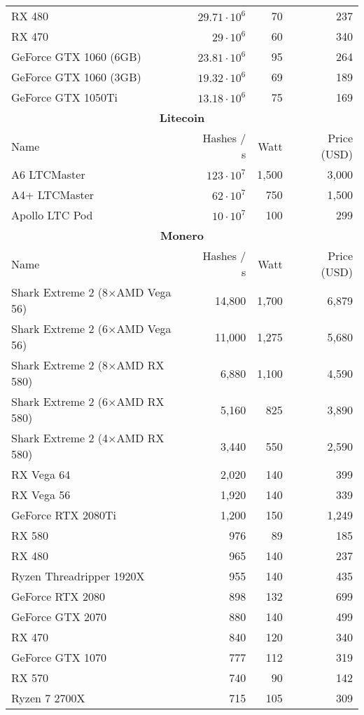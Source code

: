 \begin{longtable}{|p{}|r|r|r|}
  RX 480 & $29.71 \cdot 10^{6}$ & 70 & 237 \\
  RX 470 & $29 \cdot 10^{6}$ & 60 & 340 \\
  GeForce GTX 1060 (6GB) & $23.81 \cdot 10^{6}$ & 95 & 264 \\
  GeForce GTX 1060 (3GB) & $19.32 \cdot 10^{6}$ & 69 & 189 \\
  GeForce GTX 1050Ti & $13.18 \cdot 10^{6}$ & 75 & 169 \\
  \hline
  \multicolumn{4}{|c|}{\textbf{Litecoin}} \\
  \hline
  Name & Hashes / s & Watt & Price (USD) \\
  \hhline{|=|=|=|=|}
  A6 LTCMaster & $123 \cdot 10^{7}$ & 1,500 & 3,000 \\
  A4+ LTCMaster & $62 \cdot 10^{7}$ & 750 & 1,500 \\
  Apollo LTC Pod & $10 \cdot 10^{7}$ & 100 & 299 \\
  \hline
  \hline
  \multicolumn{4}{|c|}{\textbf{Monero}} \\
  \hline
  Name & Hashes / s & Watt & Price (USD) \\
  \hhline{|=|=|=|=|}
  Shark Extreme 2 \small(8$ \times $AMD Vega 56) & 14,800 & 1,700 & 6,879 \\
  Shark Extreme 2 \small(6$ \times $AMD Vega 56) & 11,000 & 1,275 & 5,680 \\
  Shark Extreme 2 \small(8$ \times $AMD RX 580) & 6,880 & 1,100 & 4,590 \\
  Shark Extreme 2 \small(6$ \times $AMD RX 580) & 5,160 & 825 & 3,890 \\
  Shark Extreme 2 \small(4$ \times $AMD RX 580) & 3,440 & 550 & 2,590 \\
  RX Vega 64 & 2,020 & 140 & 399 \\
  RX Vega 56 & 1,920 & 140 & 339 \\
  GeForce RTX 2080Ti & 1,200 & 150 & 1,249 \\
  RX 580 & 976 & 89 & 185 \\
  RX 480 & 965 & 140 & 237 \\
  Ryzen Threadripper 1920X & 955 & 140 & 435 \\
  GeForce RTX 2080 & 898 & 132 & 699 \\
  GeForce GTX 2070 & 880 & 140 & 499 \\
  RX 470 & 840 & 120 & 340 \\
  GeForce GTX 1070 & 777 & 112 & 319 \\
  RX 570 & 740 & 90 & 142 \\
  Ryzen 7 2700X & 715 & 105 & 309 \\

\end{longtable}
